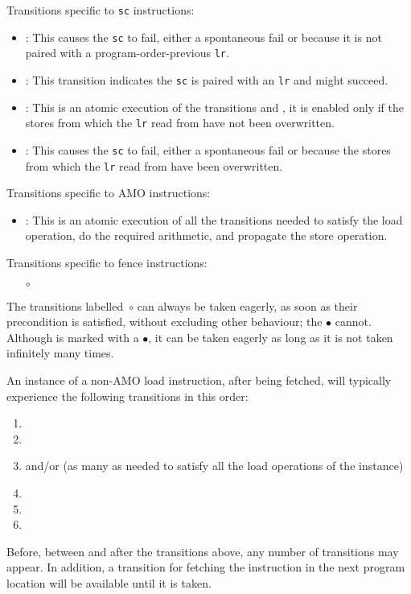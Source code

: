 \noindent Transitions specific to {\tt  sc} instructions:
\begin{itemize}
\item {}: This causes the {\tt sc} to fail, either a spontaneous fail or because it is not paired with a program-order-previous {\tt lr}.
\item {}: This transition indicates the {\tt sc} is paired with an {\tt lr} and might succeed.
\item {}: This is an atomic execution of the transitions  and , it is enabled only if the stores from which the {\tt lr} read from have not been overwritten.
\item {}: This causes the {\tt sc} to fail, either a spontaneous fail or because the stores from which the {\tt lr} read from have been overwritten.
\end{itemize}

\noindent Transitions specific to AMO instructions:
\begin{itemize}
\item {}: This is an atomic execution of all the transitions needed to satisfy the load operation, do the required arithmetic, and propagate the store operation.
\end{itemize}

\noindent Transitions specific to fence instructions:
\begin{itemize}
\item[$\circ$] 
\end{itemize}

The transitions labelled~$\circ$ can always be taken eagerly, as soon as their precondition is satisfied, without excluding other behaviour; the $\bullet$ cannot.
Although  is marked with a $\bullet$, it can be taken eagerly as long as it is not taken infinitely many times.

An instance of a non-AMO load instruction, after being fetched, will typically experience the following transitions in this order:
\begin{enumerate}
\item {}
\item {}
\item {} and/or  (as many as needed to satisfy all the load operations of the instance)
\item {}
\item {}
\item {}
\end{enumerate}
Before, between and after the transitions above, any number of  transitions may appear.
In addition, a  transition for fetching the instruction in the next program location will be available until it is taken.



